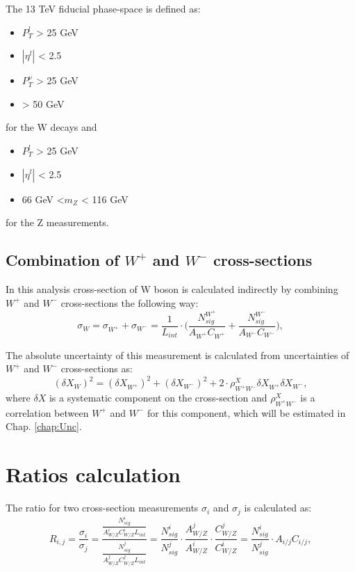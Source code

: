 The 13 TeV fiducial phase-space is defined as:
\begin{itemize}
\item $P_T^l$ > 25 GeV
\item $|\eta^l|$ < 2.5 
\item $P_T^{\nu}$ > 25 GeV
\item \mtw > 50 GeV
\end{itemize}
for the W decays and 
\begin{itemize}
\item $P_T^l$ > 25 GeV
\item $|\eta^l|$ < 2.5 
\item 66 GeV <$m_{Z}$ < 116 GeV
\end{itemize}
for the Z measurements.

\subsection{Combination of $W^{+}$ and $W^{-}$ cross-sections}\label{sec:Wcs}
In this analysis cross-section of W boson is calculated indirectly by combining $W^{+}$ and $W^{-}$ cross-sections the following way:
\begin{equation}
\sigma_{W}=\sigma_{W^{+}}+\sigma_{W^{-}} = \frac{1}{L_{int}} \cdot \Big(\frac{N^{W^+}_{sig}}{A_{W^+}C_{W^+}} +  \frac{N^{W^-}_{sig}}{A_{W^-}C_{W^-}} \Big), 
\end{equation}

The absolute uncertainty of this measurement is calculated from uncertainties of $W^{+}$ and $W^{-}$ cross-sections as:
\begin{equation}
(\delta X_{W})^2 = (\delta X_{W^{+}})^2+(\delta X_{W^{-}})^2 + 2\cdot \rho^{X}_{W^+W^-}\delta X_{W^{+}}\delta X_{W^{-}},
\end{equation}
where $\delta X$ is a systematic component on the cross-section and $\rho^{X}_{W^+W^-}$ is a correlation between $W^{+}$ and $W^{-}$ for this component, which will be estimated in Chap. \ref{chap:Unc}. 
\section{Ratios calculation}\label{sec:Rat}

The ratio for two cross-section measurements $\sigma_i$ and $\sigma_j$ is calculated as:
\begin{equation}
R_{i,j}=\frac{\sigma_i}{\sigma_j}=\frac{\frac{N^{i}_{sig}}{A^{i}_{W/Z}C^{i}_{W/Z}L_{int}}}{ \frac{N^{j}_{sig}}{A^{j}_{W/Z}C^{j}_{W/Z}L_{int}}}
=\frac{N^{i}_{sig}}{N^{j}_{sig}}\cdot \frac{A^{j}_{W/Z}}{A^{i}_{W/Z}} \cdot \frac{C^{j}_{W/Z}}{C^{i}_{W/Z}}=\frac{N^{i}_{sig}}{N^{j}_{sig}}\cdot A_{i/j} C_{i/j},
\end{equation}

